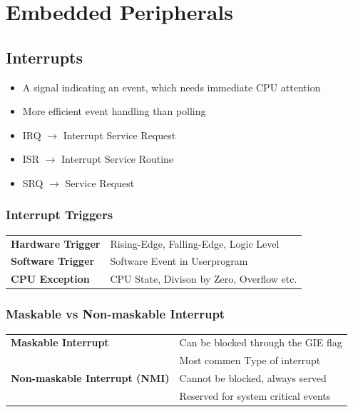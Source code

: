 \section{Embedded Peripherals}
\begin{minipage}{0.4\linewidth}
    \subsection{Interrupts }
    \begin{itemize}
    	\item A signal indicating an event, which needs immediate CPU attention
    	\item More efficient event handling than polling
    	\item \acs{IRQ} $\rightarrow$ Interrupt Service Request
    	\item \acs{ISR} $\rightarrow$ Interrupt Service Routine
    	\item \acs{SRQ} $\rightarrow$ Service Request
    \end{itemize}
\end{minipage}
\begin{minipage}{0.5\linewidth}
    \subsubsection{Interrupt Triggers}
    \begin{tabular}{ll}
    	\textbf{Hardware Trigger}& Rising-Edge, Falling-Edge, Logic Level\\
    	\textbf{Software Trigger}& Software Event in Userprogram\\
    	\textbf{\acs{CPU} Exception}& \acs{CPU} State, Divison by Zero, Overflow etc.\\
    \end{tabular}
\end{minipage}

\subsubsection{Maskable vs Non-maskable Interrupt}
\begin{tabular}{ll}
	\textbf{Maskable Interrupt}& Can be blocked through the \acs{GIE} flag\\
	& Most commen Type of interrupt\\
	\textbf{Non-maskable Interrupt (\acs{NMI})}& Cannot be blocked, always served\\
	& Reserved for system critical events\\
\end{tabular}

